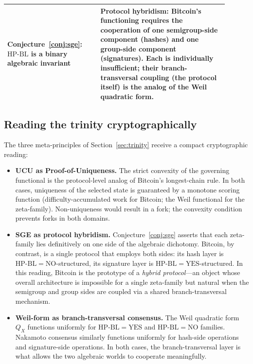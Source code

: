 \documentclass[11pt]{article}
\theoremstyle{definition}
\theoremstyle{remark}
\newcommand{\HBL}{\mathrm{HP\text{-}BL}}
\begin{document}
\begin{center}
\begin{tabular}{@{}p{0.38\linewidth} p{0.52\linewidth}@{}}
Conjecture~\ref{conj:sge}: $\HBL$ is a binary algebraic invariant &
Protocol hybridism: Bitcoin's functioning requires the cooperation
of one semigroup-side component (hashes) and one group-side
component (signatures). Each is individually insufficient; their
branch-transversal coupling (the protocol itself) is the analog of
the Weil quadratic form. \\
\bottomrule
\end{tabular}
\end{center}

\subsection{Reading the trinity cryptographically}
\label{sec:blockchain-trinity}

The three meta-principles of Section~\ref{sec:trinity} receive a
compact cryptographic reading:

\begin{itemize}
\item \textbf{UCU as Proof-of-Uniqueness.}
The strict convexity of the governing functional is the protocol-level
analog of Bitcoin's longest-chain rule. In both cases, uniqueness of
the selected state is guaranteed by a monotone scoring function
(difficulty-accumulated work for Bitcoin; the Weil functional for
the zeta-family). Non-uniqueness would result in a fork; the
convexity condition prevents forks in both domains.

\item \textbf{SGE as protocol hybridism.}
Conjecture~\ref{conj:sge} asserts that each zeta-family lies
definitively on one side of the algebraic dichotomy. Bitcoin, by
contrast, is a single protocol that employs both sides: its hash
layer is $\HBL = \mathrm{NO}$-structured, its signature layer is
$\HBL = \mathrm{YES}$-structured. In this reading, Bitcoin is the
prototype of a \emph{hybrid protocol}---an object whose overall
architecture is impossible for a single zeta-family but natural when
the semigroup and group sides are coupled via a shared
branch-transversal mechanism.

\item \textbf{Weil-form as branch-transversal consensus.}
The Weil quadratic form $Q_X$ functions uniformly for
$\HBL = \mathrm{YES}$ and $\HBL = \mathrm{NO}$ families. Nakamoto
consensus similarly functions uniformly for hash-side operations
and signature-side operations. In both cases, the branch-transversal
layer is what allows the two algebraic worlds to cooperate
meaningfully.
\end{itemize}
\end{document}
